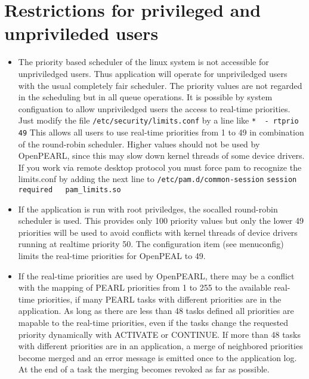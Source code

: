 \documentclass[oneside,10pt]{scrbook}
\begin{document}
\section{Restrictions for privileged and unprivileded users}
\begin{itemize}
\item The priority based scheduler of the linux system is not
   accessible for unpriviledged users. Thus application will operate for 
   unpriviledged users with
   the usual completely fair scheduler. The priority values are 
   not regarded in the scheduling but in all queue operations.
   It is possible by system configuation to allow unpriviledged users
   the access to real-time priorities. Just modify the file
   \verb|/etc/security/limits.conf| by a line like\newline
   \verb|*  - rtprio 49|\newline
   This allows all users to use real-time priorities from 1 to 49 in combination of 
   the round-robin scheduler.
   Higher values should not be used by OpenPEARL, since this may 
   slow down kernel threads of some device drivers.
   \newline
   If you work via remote desktop protocol you must force pam to
   recognize the limits.conf by adding the next line to \verb|/etc/pam.d/common-session|
   \newline
   \verb|session    required   pam_limits.so|
\item If the application is run with root priviledges, the socalled 
  round-robin scheduler is used. This provides only 100 priority values but
  only the lower 49 priorities will be used to avoid conflicts with
  kernel threads of device drivers running at realtime priority 50.
  The configuration item (see menuconfig) limits the real-time priorities for
  OpenPEAL to 49.
\item If the real-time priorities are used by OpenPEARL, there may be a conflict with the
  mapping of  
  PEARL priorities from 1 to 255 to the available real-time priorities, if many PEARL tasks 
  with different priorities are in the application. As long as there are less than 48 tasks 
  defined all priorities are mapable to the real-time priorities, even if the tasks change the 
  requested priority dynamically with ACTIVATE or CONTINUE.
  If more than 48 tasks with different priorities are in an application, 
  a merge of neighbored priorities become merged and an error message is emitted once 
  to the application log. At the end of a task the merging becomes revoked as far as possible.


\end{itemize}
\end{document}
